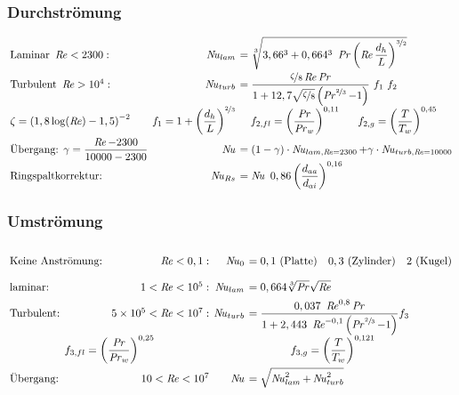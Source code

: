 \subsubsection{Durchströmung}
	\skipabove{-20pt}
	\[ \arraycolsep=0.2em  \def\arraystretch{2}
	\begin{array}{lrll}
		\text{Laminar } \Reyn <2300: & \Nuss_{lam} & \multicolumn{2}{l}{ = \sqrt[3]{3,66^3 + 0,664^3\ \Pran \left(\Reyn \dfrac{d_h}{L}\right)^{\nicefrac{3}{2}}}}\\
		\text{Turbulent } \Reyn>10^4: &\Nuss_{turb} & \multicolumn{2}{l}{ = \dfrac{\nicefrac{ \zeta}{8}\Reyn\Pran}{1 + 12,7 \sqrt{\nicefrac{ \zeta}{8}} \left( \Pran^{\nicefrac{2}{3}} - 1\right)} \ f_1 \ f_2 } \\
		 \zeta = \left(1,8 \log(\Reyn) - 1,5\right)^{-2} & f_1 = 1 + \left(\dfrac{d_h}{L}\right)^{\nicefrac{2}{3}} & \quad f_{2,fl} = \left(\dfrac{\Pran}{\Pran_w}\right)^{0,11} &\quad f_{2,g} = \left(\dfrac{T}{T_w}\right)^{0,45} \\
		\text{Übergang: } \gamma = \dfrac{\Reyn-2300}{10000-2300} &\Nuss & \multicolumn{2}{l}{= (1-\gamma)\cdot \Nuss_{lam,\Reyn=2300} + \gamma\cdot \Nuss_{turb,\Reyn=10000}}\\
		\text{Ringspaltkorrektur: }&\Nuss_{Rs}& = \Nuss\ 0,86 \left(\dfrac{d_{aa}}{d_{ai}}\right)^{0,16}&
	\end{array} \]

\subsubsection{Umströmung}
	\skipabove{-20pt}
	\[ \arraycolsep=0.2em  \def\arraystretch{2}
	\begin{array}{lrrl}
		\text{Keine Anströmung: } & \Reyn<0,1:            & \Nuss_0      & = 0,1\ (\text{Platte}) \quad 0,3\ (\text{Zylinder}) \quad 2\ (\text{Kugel})                        \\
		\text{laminar: }          & 1<\Reyn<10^5:         & \Nuss_{lam}  & = 0,664 \sqrt[3]{\Pran}\sqrt{\Reyn}                                                                \\
		\text{Turbulent: }        & \num{5e5}<\Reyn<10^7: & \Nuss_{turb} & = \dfrac{0,037\ \Reyn^{0,8} \Pran}{1+ 2,443\ \Reyn^{-0,1} \left(\Pran^{\sfrac{2}{3}} - 1\right)} f_3\\
		\multicolumn{2}{c}{f_{3,fl} =\left(\dfrac{\Pran}{\Pran_w}\right)^{0,25}} & \multicolumn{2}{c}{f_{3,g} = \left(\dfrac{T}{T_w}\right)^{0,121}}\\
		\text{Übergang: } & 10<\Reyn<10^7 & \Nuss& = \sqrt{\Nuss_{lam}^2 + \Nuss_{turb}^2}
	\end{array} \]

